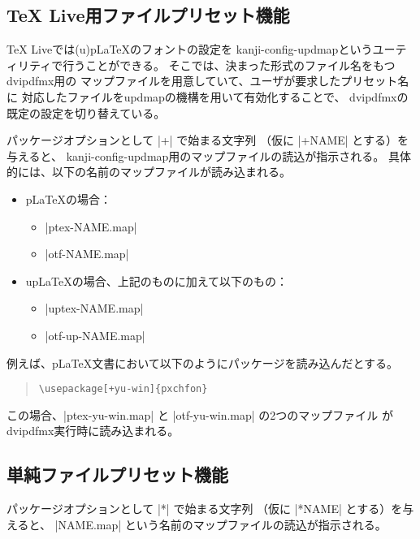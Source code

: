 \documentclass[uplatex,dvipdfmx,a4paper]{jsarticle}
\providecommand{\pLaTeX}{p\LaTeX}
\providecommand{\upLaTeX}{u\pLaTeX}
\begin{document}
\subsection{{\TeX} Live用ファイルプリセット機能}

{\TeX} Liveでは{(u)\pLaTeX}のフォントの設定を
kanji-config-updmapというユーティリティで行うことができる。
そこでは、決まった形式のファイル名をもつdvipdfmx用の
マップファイルを用意していて、ユーザが要求したプリセット名に
対応したファイルをupdmapの機構を用いて有効化することで、
dvipdfmxの既定の設定を切り替えている。

パッケージオプションとして |+| で始まる文字列
（仮に |+NAME| とする）を与えると、
kanji-config-updmap用のマップファイルの読込が指示される。
具体的には、以下の名前のマップファイルが読み込まれる。

\begin{itemize}
\item {\pLaTeX}の場合：
  \begin{itemize}
  \item |ptex-NAME.map|
  \item |otf-NAME.map|
  \end{itemize}
\item {\upLaTeX}の場合、上記のものに加えて以下のもの：
  \begin{itemize}
  \item |uptex-NAME.map|
  \item |otf-up-NAME.map|
  \end{itemize}
\end{itemize}

例えば、{\pLaTeX}文書において以下のようにパッケージを読み込んだとする。

\begin{quote}\small\begin{verbatim}
\usepackage[+yu-win]{pxchfon}
\end{verbatim}\end{quote}

この場合、|ptex-yu-win.map| と |otf-yu-win.map| の2つのマップファイル
がdvipdfmx実行時に読み込まれる。

\subsection{単純ファイルプリセット機能}

パッケージオプションとして |*| で始まる文字列
（仮に |*NAME| とする）を与えると、
|NAME.map| という名前のマップファイルの読込が指示される。
\end{document}

